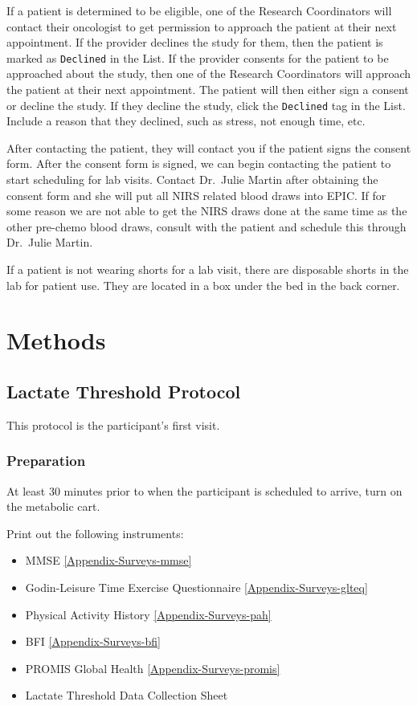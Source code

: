 \documentclass[
]{book}
\providecommand{\tightlist}{%
  \setlength{\itemsep}{0pt}\setlength{\parskip}{0pt}}
\begin{document}
If a patient is determined to be eligible, one of the Research Coordinators will contact their oncologist to get permission to approach the patient at their next appointment. If the provider declines the study for them, then the patient is marked as \texttt{Declined} in the List. If the provider consents for the patient to be approached about the study, then one of the Research Coordinators will approach the patient at their next appointment. The patient will then either sign a consent or decline the study. If they decline the study, click the \texttt{Declined} tag in the List. Include a reason that they declined, such as stress, not enough time, etc.

After contacting the patient, they will contact you if the patient signs the consent form. After the consent form is signed, we can begin contacting the patient to start scheduling for lab visits. Contact Dr.~Julie Martin after obtaining the consent form and she will put all NIRS related blood draws into EPIC. If for some reason we are not able to get the NIRS draws done at the same time as the other pre-chemo blood draws, consult with the patient and schedule this through Dr.~Julie Martin.

If a patient is not wearing shorts for a lab visit, there are disposable shorts in the lab for patient use. They are located in a box under the bed in the back corner.

\hypertarget{Methods}{%
\chapter{Methods}\label{Methods}}

\hypertarget{Methods-LT}{%
\section{Lactate Threshold Protocol}\label{Methods-LT}}

This protocol is the participant's first visit.

\hypertarget{Methods-LT-prep}{%
\subsection{Preparation}\label{Methods-LT-prep}}

At least 30 minutes prior to when the participant is scheduled to arrive, turn on the metabolic cart.

Print out the following instruments:

\begin{itemize}
\tightlist
\item
  MMSE \ref{Appendix-Surveys-mmse}
\item
  Godin-Leisure Time Exercise Questionnaire \ref{Appendix-Surveys-glteq}
\item
  Physical Activity History \ref{Appendix-Surveys-pah}
\item
  BFI \ref{Appendix-Surveys-bfi}
\item
  PROMIS Global Health \ref{Appendix-Surveys-promis}
\item
  Lactate Threshold Data Collection Sheet
\end{itemize}
\end{document}

